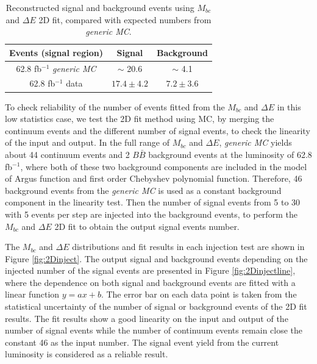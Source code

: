  \begin{table}[htpb]
 	\centering 
 	\caption{Reconstructed signal and background events using $M_{bc}$ and $\Delta E$ 2D fit, compared with expected numbers from \textit{generic MC}.}
 	\label{tab:recoB}
 	\begin{tabular}{|c|c|c|} 
 		\hline
 		Events (signal region) & Signal &  Background\\
 		\hline
 		62.8 fb$^{-1}$ \textit{generic MC} & $\sim$ 20.6 & $\sim$ 4.1\\
 		\hline
 	    62.8 fb$^{-1}$ data & $17.4\pm 4.2$ & $7.2\pm 3.6$\\
 		\hline
 	\end{tabular}
 \end{table}
 
 
To check reliability of the number of events fitted from the $M_{bc}$ and $\Delta E$ in this low statistics case, we test the 2D fit method using MC, by merging the continuum events and the different number of signal events, to check the linearity of the input and output. In the full range of $M_{bc}$ and $\Delta E$, \textit{generic MC} yields about 44 continuum events and 2 $B\bar{B}$ background events at the luminosity of 62.8 fb$^{-1}$, where both of these two background components are included in the model of Argus function and first order Chebyshev polynomial function. Therefore,  46 background events from the \textit{generic MC} is used as a constant background component in the linearity test. Then the number of signal events from 5 to 30 with 5 events per step are injected into the background events, to perform the $M_{bc}$ and $\Delta E$ 2D fit to obtain the output signal events number.

The $M_{bc}$ and $\Delta E$ distributions and fit results in each injection test are shown in Figure \ref{fig:2Dinject}. The output signal and background events depending on the injected number of the signal events are presented in Figure \ref{fig:2Dinjectline}, where the dependence on both signal and background events are fitted with a linear function $y = ax+b$. The error bar on each data point is taken from the statistical uncertainty of the number of signal or background events of the 2D fit results. The fit results show a good linearity on the input and output of the number of signal events while the number of continuum events remain close the constant 46 as the input number. The signal event yield from the current luminosity is considered as a reliable result. 


